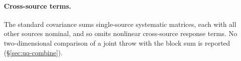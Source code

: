 \paragraph{Cross-source terms.} The standard covariance sums single-source systematic matrices, each with all other sources nominal, and so omits nonlinear cross-source response terms. No two-dimensional comparison of a joint throw with the block sum is reported (\S\ref{sec:uq-combine}).

